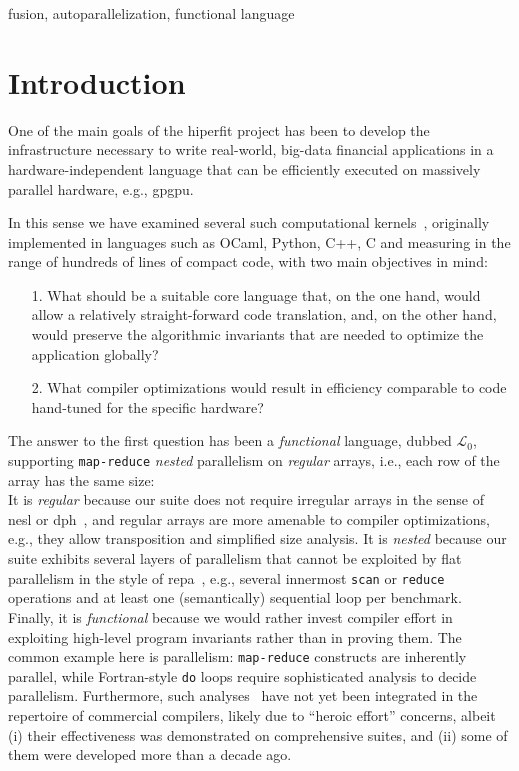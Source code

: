 \documentclass{sigplanconf}  %
\newcommand{\LO}{$\mathcal{L}_0$}
\begin{document}
\keywords
fusion, autoparallelization, functional language

\section{Introduction}
\label{sec:Introduction}

One of the main goals of the {\sc hiperfit} project has been to
develop the infrastructure necessary to write real-world, big-data 
financial applications in a hardware-independent language that can 
be efficiently executed on massively parallel hardware, e.g., {\sc gpgpu}.  

In this sense we have examined several such computational kernels~\cite{LexiFiPricing}, 
originally implemented in languages such as OCaml, Python, C++, C
and measuring in the range of hundreds of lines of compact code, 
with two main objectives in mind: 
\begin{itemize}
    \item[1.] What should be a suitable core language that, on the
                one hand, would allow a relatively straight-forward 
                code translation, and, on the other hand, would
                preserve the algorithmic invariants that are needed
                to optimize the application globally?

    \item[2.] What compiler optimizations would result in
                efficiency comparable to code hand-tuned for the specific hardware?
\end{itemize}

The answer to the first question has been %
a {\em functional} language, dubbed \LO{}, supporting %
\texttt{map-reduce} {\em nested} parallelism on {\em regular} arrays, i.e., 
each row of the array has the same size:\\
It is {\em regular} because our suite does not require irregular 
arrays in the sense of {\sc nesl} or {\sc dph}~\cite{BlellochCACM96NESL,Chak06DPH},
and regular arrays are more amenable to compiler optimizations,
e.g., they allow transposition and simplified size analysis. 
%
It is {\em nested} because our suite exhibits several layers of 
parallelism that cannot be exploited by flat parallelism in the style of 
{\sc repa}~\cite{keller2010regular}, e.g., several innermost {\tt scan} or 
{\tt reduce} operations and at least one (semantically)
sequential loop per benchmark.
%
Finally, it is {\em functional} because we would rather invest compiler effort
in exploiting high-level program invariants rather than in proving them.
The common example here is parallelism: {\tt map-reduce} 
constructs are inherently parallel, while Fortran-style \texttt{do} 
loops require sophisticated analysis to decide parallelism. 
Furthermore, such analyses~\cite{Blume94RangeTest,SUIF,CosPLDI,SummaryMonot} 
have not yet been integrated in the repertoire of commercial compilers,
likely due to ``heroic effort'' concerns, albeit
 (i) their effectiveness was demonstrated on comprehensive suites, and
(ii) some of them were developed more than a decade ago.
\end{document}
